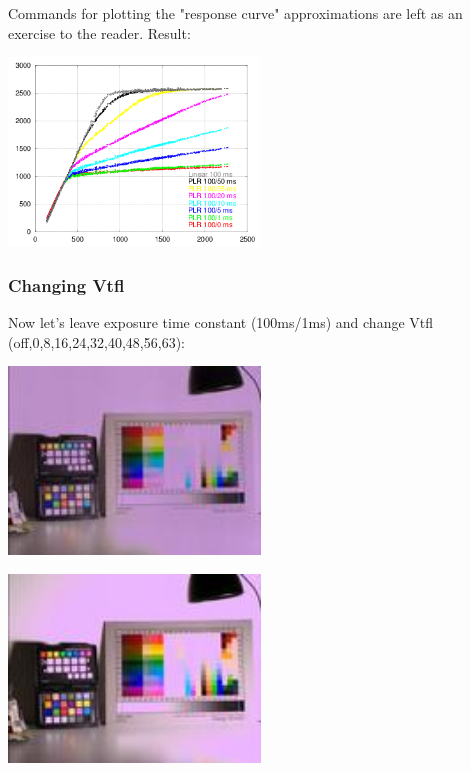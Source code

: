 {Commands for plotting the "response curve" approximations are left as an exercise to the reader. Result: 

\begin{center}
\includegraphics[height=5cm]{images/100-x-32-plr-vs-30ms-lin}
\end{center}

\subsubsection{Changing Vtfl}

Now let's leave exposure time constant (100ms/1ms) and change Vtfl (off,0,8,16,24,32,40,48,56,63): 

\begin{center}
\includegraphics[height=5cm]{images/100ms-1ms-00-tiny}
\end{center}

\begin{center}
\includegraphics[height=5cm]{images/100ms-1ms-0-tiny}
\end{center}

}
